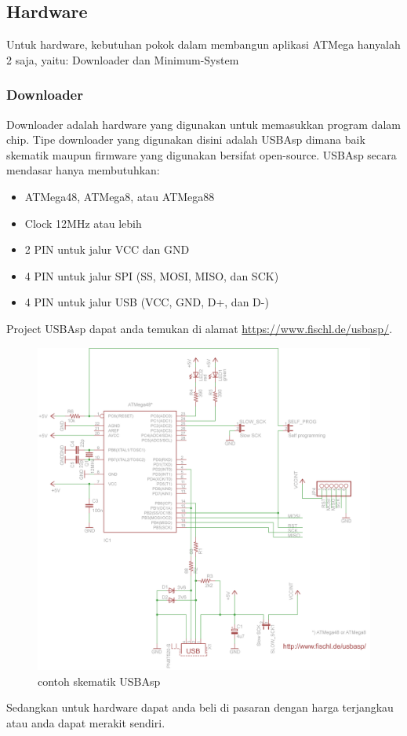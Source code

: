 \documentclass[12pt,]{article}
\begin{document}
	\newpage
	\subsection{Hardware}
	
	Untuk hardware, kebutuhan pokok dalam membangun aplikasi ATMega hanyalah 2 saja, yaitu: Downloader dan Minimum-System 
	
	\subsubsection{Downloader}
	Downloader adalah hardware yang digunakan untuk memasukkan program dalam chip.
	Tipe downloader yang digunakan disini adalah USBAsp dimana baik skematik maupun firmware yang digunakan bersifat open-source.
	USBAsp secara mendasar hanya membutuhkan:
	\begin{itemize}
		\item ATMega48, ATMega8, atau ATMega88
		\item Clock 12MHz atau lebih
		\item 2 PIN untuk jalur VCC dan GND
		\item 4 PIN untuk jalur SPI (SS, MOSI, MISO, dan SCK)
		\item 4 PIN untuk jalur USB (VCC, GND, D+, dan D-)
	\end{itemize}
	Project USBAsp dapat anda temukan di alamat \url{https://www.fischl.de/usbasp/}.
	
	\begin{figure}[H]
		\centering
		\includegraphics[width=0.6\linewidth]{images/usbasp}
		\caption{contoh skematik USBAsp}
	\end{figure}

	Sedangkan untuk hardware dapat anda beli di pasaran dengan harga terjangkau atau anda dapat merakit sendiri.
	
\end{document}
